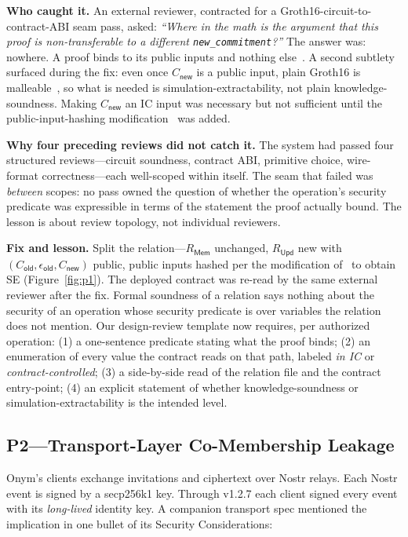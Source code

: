 \documentclass{IEEEcsmag}
\newcommand{\Cold}{C_{\mathsf{old}}}
\newcommand{\Cnew}{C_{\mathsf{new}}}
\newcommand{\eold}{\epsilon_{\mathsf{old}}}
\newcommand{\Rmem}{R_{\mathsf{Mem}}}
\newcommand{\Rupd}{R_{\mathsf{Upd}}}
\begin{document}
\textbf{Who caught it.} An external reviewer, contracted for a Groth16-circuit-to-contract-ABI seam pass, asked: \emph{``Where in the math is the argument that this proof is non-transferable to a different \texttt{new\_commitment}?''} The answer was: nowhere. A proof binds to its public inputs and nothing else~\cite{groth2016,lipmaa2019}. A second subtlety surfaced during the fix: even once $\Cnew$ is a public input, plain Groth16 is malleable~\cite{grothmaller2017}, so what is needed is simulation-extractability, not plain knowledge-soundness. Making $\Cnew$ an IC input was necessary but not sufficient until the public-input-hashing modification~\cite{baghery2021} was added.

\textbf{Why four preceding reviews did not catch it.} The system had passed four structured reviews---circuit soundness, contract ABI, primitive choice, wire-format correctness---each well-scoped within itself. The seam that failed was \emph{between} scopes: no pass owned the question of whether the operation's security predicate was expressible in terms of the statement the proof actually bound. The lesson is about review topology, not individual reviewers.

\textbf{Fix and lesson.} Split the relation---$\Rmem$ unchanged, $\Rupd$ new with $(\Cold, \eold, \Cnew)$ public, public inputs hashed per the modification of~\cite{baghery2021} to obtain SE (Figure~\ref{fig:p1}). The deployed contract was re-read by the same external reviewer after the fix. Formal soundness of a relation says nothing about the security of an operation whose security predicate is over variables the relation does not mention. Our design-review template now requires, per authorized operation: (1) a one-sentence predicate stating what the proof binds; (2) an enumeration of every value the contract reads on that path, labeled \emph{in IC} or \emph{contract-controlled}; (3) a side-by-side read of the relation file and the contract entry-point; (4) an explicit statement of whether knowledge-soundness or simulation-extractability is the intended level.

\subsection{P2---Transport-Layer Co-Membership Leakage}

Onym's clients exchange invitations and ciphertext over Nostr relays. Each Nostr event is signed by a secp256k1 key. Through v1.2.7 each client signed every event with its \emph{long-lived} identity key. A companion transport spec mentioned the implication in one bullet of its Security Considerations:
\end{document}

